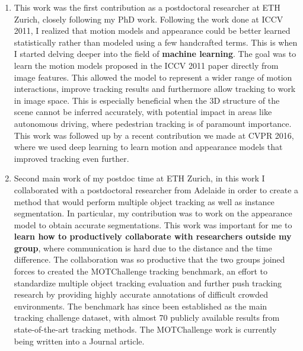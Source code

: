 \documentclass[10pt, oneside,english]{article}
\begin{document}
\begin{enumerate}
\vspace{0.6cm}


\item {}
\vspace{0.2cm}

This work was the first contribution as a postdoctoral researcher at ETH Zurich, closely following my PhD work. Following the work done at ICCV 2011, I realized that motion models and appearance could be better learned statistically rather than modeled using a few handcrafted terms. This is when I started delving deeper into the field of {\bf machine learning}. The goal was to learn the motion models proposed in the ICCV 2011 paper directly from image features.  This allowed the model to represent a wider range of motion interactions, improve tracking results and furthermore allow tracking to work in image space.  This is especially beneficial when the 3D structure of the scene cannot be inferred accurately, with potential impact in areas like autonomous driving, where pedestrian tracking is of paramount importance.
This work was followed up by a recent contribution we made at CVPR 2016, where we used deep learning to learn motion and appearance models that improved tracking even further.

\vspace{0.6cm}



\item {}
\vspace{0.2cm}

Second main work of my postdoc time at ETH Zurich, in this work I collaborated with a postdoctoral researcher from Adelaide in order to create a method that would perform multiple object tracking as well as instance segmentation. In particular, my contribution was to work on the appearance model to obtain accurate segmentations. This work was important for me to {\bf learn how to productively collaborate with researchers outside my group}, where communication is hard due to the distance and the time difference. 
The collaboration was so productive that the two groups joined forces to created the MOTChallenge tracking benchmark, an effort to standardize multiple object tracking evaluation and further push tracking research by providing highly accurate annotations of difficult crowded environments. The benchmark has since been established as the main tracking challenge dataset, with almost 70 publicly available results from state-of-the-art tracking methods.
The MOTChallenge work is currently being written into a Journal article.



\end{enumerate}
\end{document}
